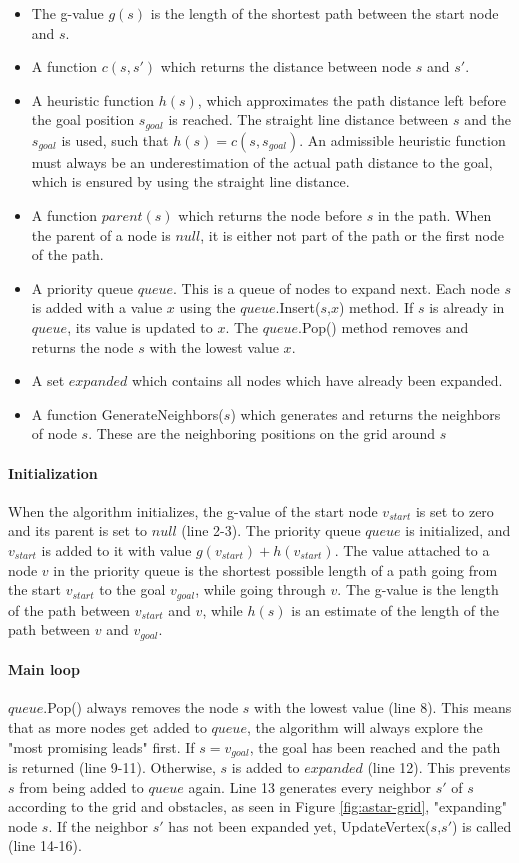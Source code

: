 \begin{itemize}
\item The g-value $g(s)$ is the length of the shortest path between the start node and $s$.
\item A function $c(s,s')$ which returns the distance between node $s$ and $s'$.
\item A heuristic function $h(s)$, which approximates the path distance left before the goal position $s_{goal}$ is reached. The straight line distance between $s$ and the $s_{goal}$ is used, such that $h(s) = c(s,s_{goal})$. An admissible heuristic function must always be an underestimation of the actual path distance to the goal, which is ensured by using the straight line distance. 
\item A function $parent(s)$ which returns the node before $s$ in the path. When the parent of a node is $null$, it is either not part of the path or the first node of the path.
\item A priority queue $queue$. This is a queue of nodes to expand next. Each node $s$ is added with a value $x$ using the $queue.$Insert($s$,$x$) method. If $s$ is already in $queue$, its value is updated to $x$. The $queue$.Pop() method removes and returns the node $s$ with the lowest value $x$.
\item A set $expanded$ which contains all nodes which have already been expanded.
\item A function GenerateNeighbors($s$) which generates and returns the neighbors of node $s$. These are the neighboring positions on the grid around $s$
\end{itemize}
\paragraph{Initialization}
When the algorithm initializes, the g-value of the start node $v_{start}$ is set to zero and its parent is set to $null$ (line 2-3). The priority queue $queue$ is initialized, and $v_{start}$ is added to it with value $g(v_{start}) + h(v_{start})$. The value attached to a node $v$ in the priority queue is the shortest possible length of a path going from the start $v_{start}$ to the goal $v_{goal}$, while going through $v$. The g-value is the length of the path between $v_{start}$ and $v$, while $h(s)$ is an estimate of the length of the path between $v$ and $v_{goal}$.
\paragraph{Main loop}
$queue$.Pop() always removes the node $s$ with the lowest value (line 8). This means that as more nodes get added to $queue$, the algorithm will always explore the "most promising leads" first. If $s = v_{goal}$, the goal has been reached and the path is returned (line 9-11). Otherwise, $s$ is added to $expanded$ (line 12). This prevents $s$ from being added to $queue$ again. Line 13 generates every neighbor $s'$ of $s$ according to the grid and obstacles, as seen in Figure \ref{fig:astar-grid}, "expanding" node $s$. If the neighbor $s'$ has not been expanded yet, UpdateVertex($s$,$s'$) is called (line 14-16).
